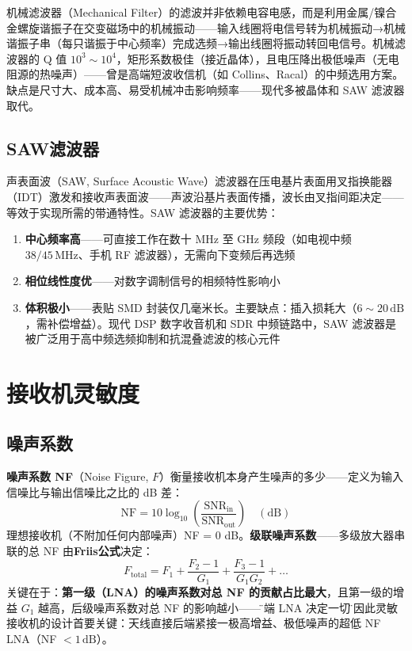 \documentclass[12pt,UTF8]{ctexbook}
\begin{document}
机械滤波器（Mechanical Filter）的滤波并非依赖电容电感，而是利用金属/镍合金螺旋谐振子在交变磁场中的机械振动——输入线圈将电信号转为机械振动→机械谐振子串（每只谐振于中心频率）完成选频→输出线圈将振动转回电信号。机械滤波器的 Q 值 $10^3\sim10^4$，矩形系数极佳（接近晶体），且电压降出极低噪声（无电阻源的热噪声）——曾是高端短波收信机（如 Collins、Racal）的中频选用方案。缺点是尺寸大、成本高、易受机械冲击影响频率——现代多被晶体和 SAW 滤波器取代。

\subsection{SAW滤波器}

声表面波（SAW, Surface Acoustic Wave）滤波器在压电基片表面用叉指换能器（IDT）激发和接收声表面波——声波沿基片表面传播，波长由叉指间距决定——等效于实现所需的带通特性。SAW 滤波器的主要优势：
\begin{enumerate}
\item \textbf{中心频率高}——可直接工作在数十 MHz 至 GHz 频段（如电视中频 $38/45\,\mathrm{MHz}$、手机 RF 滤波器），无需向下变频后再选频
\item \textbf{相位线性度优}——对数字调制信号的相频特性影响小
\item \textbf{体积极小}——表贴 SMD 封装仅几毫米长。主要缺点：插入损耗大（$6\sim20\,\mathrm{dB}$，需补偿增益）。现代 DSP 数字收音机和 SDR 中频链路中，SAW 滤波器是被广泛用于高中频选频抑制和抗混叠滤波的核心元件
\end{enumerate}

\section{接收机灵敏度}
\label{sec:rx_sensitivity}

\subsection{噪声系数}

\textbf{噪声系数 NF}（Noise Figure, $F$）衡量接收机本身产生噪声的多少——定义为输入信噪比与输出信噪比之比的 dB 差：
\[
\mathrm{NF} = 10\log_{10}\!\left(\frac{\mathrm{SNR_{in}}}{\mathrm{SNR_{out}}}\right) \quad (\mathrm{dB})
\]
理想接收机（不附加任何内部噪声）NF = 0 dB。\textbf{级联噪声系数}——多级放大器串联的总 NF 由\textbf{Friis公式}决定：
\[
F_{\mathrm{total}} = F_1 + \frac{F_2-1}{G_1} + \frac{F_3-1}{G_1 G_2} + \ldots
\]
关键在于：\textbf{第一级（LNA）的噪声系数对总 NF 的贡献占比最大}，且第一级的增益 $G_1$ 越高，后级噪声系数对总 NF 的影响越小——\"前端 LNA 决定一切\"。因此灵敏接收机的设计首要关键：天线直接后端紧接一极高增益、极低噪声的超低 NF LNA（NF $<1\,\mathrm{dB}$）。
\end{document}
